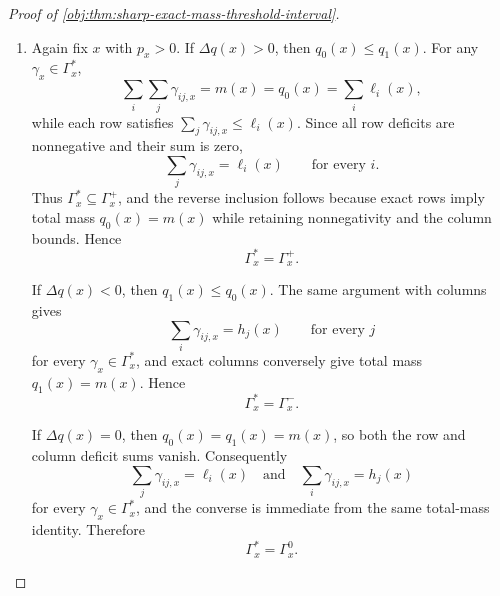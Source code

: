 \begin{proof}[Proof of \cref{obj:thm:sharp-exact-mass-threshold-interval}]
\begin{enumerate}
Applying this proof-local realization claim to \(\widetilde\gamma\), the realized coupling in cell \(x\) is \(\gamma_x\).  Therefore the projection set of feasible full laws is exactly \(\Gamma_x^\ast\). %

\item Again fix \(x\) with \(p_x>0\).  If \(\Delta q(x)>0\), then \(q_0(x)\le q_1(x)\).  For any \(\gamma_x\in\Gamma_x^\ast\),
\[
\sum_i\sum_j\gamma_{ij,x}=m(x)=q_0(x)=\sum_i\ell_i(x),
\]
while each row satisfies \(\sum_j\gamma_{ij,x}\le \ell_i(x)\).  Since all row deficits are nonnegative and their sum is zero,
\[
\sum_j\gamma_{ij,x}=\ell_i(x)\qquad\text{for every }i.
\]
Thus \(\Gamma_x^\ast\subseteq\Gamma_x^+\), and the reverse inclusion follows because exact rows imply total mass \(q_0(x)=m(x)\) while retaining nonnegativity and the column bounds.  Hence
\[
\Gamma_x^\ast=\Gamma_x^+ .
\]

If \(\Delta q(x)<0\), then \(q_1(x)\le q_0(x)\).  The same argument with columns gives
\[
\sum_i\gamma_{ij,x}=h_j(x)\qquad\text{for every }j
\]
for every \(\gamma_x\in\Gamma_x^\ast\), and exact columns conversely give total mass \(q_1(x)=m(x)\).  Hence
\[
\Gamma_x^\ast=\Gamma_x^- .
\]

If \(\Delta q(x)=0\), then \(q_0(x)=q_1(x)=m(x)\), so both the row and column deficit sums vanish.  Consequently
\[
\sum_j\gamma_{ij,x}=\ell_i(x)\quad\text{and}\quad
\sum_i\gamma_{ij,x}=h_j(x)
\]
for every \(\gamma_x\in\Gamma_x^\ast\), and the converse is immediate from the same total-mass identity.  Therefore
\[
\Gamma_x^\ast=\Gamma_x^0 .
\] %


\end{enumerate}
\end{proof}
